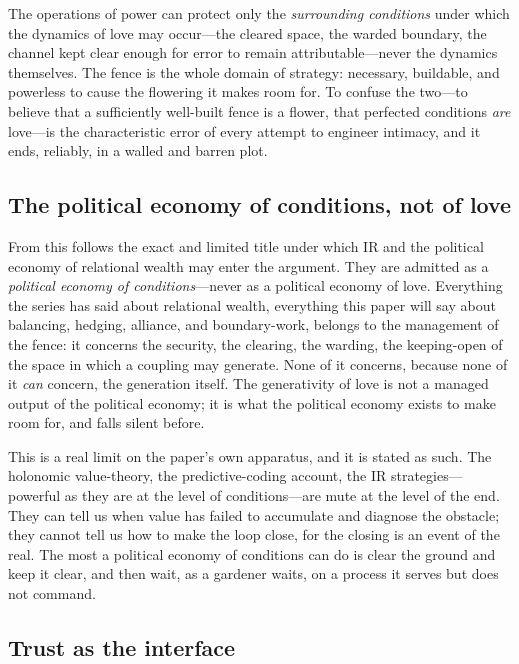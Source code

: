 \begin{claim}
The operations of power can protect only the \emph{surrounding conditions} under which the dynamics of love may occur---the cleared space, the warded boundary, the channel kept clear enough for error to remain attributable---never the dynamics themselves. The fence is the whole domain of strategy: necessary, buildable, and powerless to cause the flowering it makes room for. To confuse the two---to believe that a sufficiently well-built fence is a flower, that perfected conditions \emph{are} love---is the characteristic error of every attempt to engineer intimacy, and it ends, reliably, in a walled and barren plot.
\end{claim}

\subsection{The political economy of conditions, not of love}
\label{p17:sub:conditions-pe}

From this follows the exact and limited title under which IR and the political economy of relational wealth may enter the argument. They are admitted as a \emph{political economy of conditions}---never as a political economy of love. Everything the series has said about relational wealth, everything this paper will say about balancing, hedging, alliance, and boundary-work, belongs to the management of the fence: it concerns the security, the clearing, the warding, the keeping-open of the space in which a coupling may generate. None of it concerns, because none of it \emph{can} concern, the generation itself. The generativity of love is not a managed output of the political economy; it is what the political economy exists to make room for, and falls silent before.

This is a real limit on the paper's own apparatus, and it is stated as such. The holonomic value-theory, the predictive-coding account, the IR strategies---powerful as they are at the level of conditions---are mute at the level of the end. They can tell us when value has failed to accumulate and diagnose the obstacle; they cannot tell us how to make the loop close, for the closing is an event of the real. The most a political economy of conditions can do is clear the ground and keep it clear, and then wait, as a gardener waits, on a process it serves but does not command.

\subsection{Trust as the interface}
\label{p17:sub:conditions-trust}

